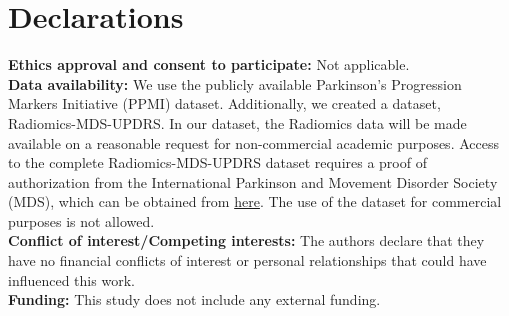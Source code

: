 \documentclass[twocolumn]{article}
\begin{document}
\section*{Declarations}
\noindent
\textbf{Ethics approval and consent to participate:} Not applicable. \\
\textbf{Data availability:}  We use the publicly available Parkinson's Progression Markers Initiative (PPMI) \cite{marek2011parkinson} dataset. Additionally, we created a dataset, Radiomics-MDS-UPDRS. In our dataset, the Radiomics data will be made available on a reasonable request for non-commercial academic purposes. Access to the complete Radiomics-MDS-UPDRS dataset requires a proof of authorization from the International Parkinson and Movement Disorder Society (MDS), which can be obtained from
\href{https://mds.movementdisorders.org/publications/rating_scales/request_form.php}{here}.  The use of the dataset for commercial purposes is not allowed. \\
\textbf{Conflict of interest/Competing interests:} The authors declare that they have no financial conflicts of interest or personal relationships that could have influenced this work.\\
\textbf{Funding:} This study does not include any external funding.
\end{document}
